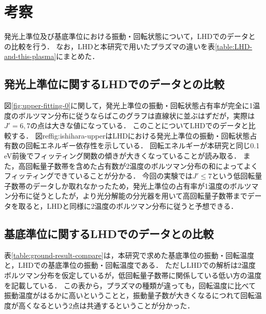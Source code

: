\chapter{考察}
発光上準位及び基底準位における振動・回転状態について，LHDでのデータとの比較を行う．
なお，LHDと本研究で用いたプラズマの違いを表\ref{table:LHD-and-this-plasma}にまとめた．

\section{発光上準位に関するLHDでのデータとの比較}
図\ref{fig:upper-fitting-0}に関して，発光上準位の振動・回転状態占有率が完全に1温度のボルツマン分布に従うならばこのグラフは直線状に並ぶはずだが，実際は$J'=6,7$の点は大きな値になっている．
このことについてLHDでのデータと比較する．
図ref{fig:ishihara-upper}はLHDにおける発光上準位の振動・回転状態占有数の回転エネルギー依存性を示している．
回転エネルギーが本研究と同じ0.1 eV前後でフィッティング関数の傾きが大きくなっていることが読み取る．
また，高回転量子数帯を含めた占有数が2温度のボルツマン分布の和によってよくフィッティングできていることが分かる．
今回の実験では$J' \leq 7$という低回転量子数帯のデータしか取れなかったため，発光上準位の占有率が1温度のボルツマン分布に従うとしたが，より光分解能の分光器を用いて高回転量子数帯までデータを取ると，LHDと同様に2温度のボルツマン分布に従うと予想できる．

\section{基底準位に関するLHDでのデータとの比較}
表\ref{table:ground-result-compare}は，本研究で求めた基底準位の振動・回転温度と，LHDでの基底準位の振動・回転温度である．
ただしLHDでの解析は2温度ボルツマン分布を仮定しているが，低回転量子数帯に関係している低い方の温度を記載している．
この表から，プラズマの種類が違っても，回転温度に比べて振動温度がはるかに高いということと，振動量子数が大きくなるにつれて回転温度が高くなるという2点は共通するということが分かった．

\begin{comment}
図\ref{fig:upper-fitting-0}に関して，発光上準位の振動・回転状態占有率が完全にボルツマン分布に従うとするとこのグラフは直線になるはずだが，実際は$v'=0$の$J'=6,7$の点は大きな値になっている．
このことから，回転温度は視線方向に一定ではないことが考えられる．
高回転量子数域を含めた発光上準位の占有数のボルツマンプロットが直線から外れることは，他のプラズマでも報告されている．
図\ref{fig:ishihara-upper-boltzmann}は，岐阜県土岐市の核融合科学研究所にある大型ヘリカル装置(LHD)でのプラズマにおける，発光上準位における占有数のボルツマンプロットである\cite{ishihara}．
図中の点線は高低2温度のボルツマン分布を仮定したフィッティング結果であり，良く近似できていることが分かる．
また，発光上準位の占有数分布が2温度のボルツマン分布で良く近似できることは，放電の種類に関わらず複数計測されている\cite{ishihara, two-temperature-1, two-temperature-2}．
本研究の対称としたプラズマでも，より光分解能の分光器を用いて高回転量子数域までデータを取り，2温度のボルツマン分布を仮定することで，正確な占有率を計算することができると考えられる．
\end{comment}